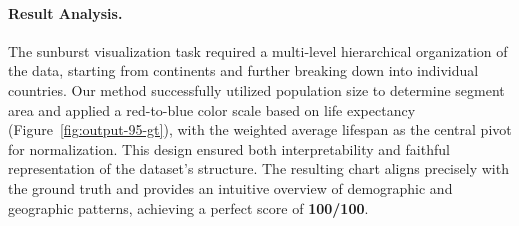 \paragraph{Result Analysis.}
The sunburst visualization task required a multi-level hierarchical organization of the data, 
starting from continents and further breaking down into individual countries. Our method 
successfully utilized population size to determine segment area and applied a red-to-blue 
color scale based on life expectancy (Figure~\ref{fig:output-95-gt}), with the weighted average lifespan as the central pivot 
for normalization. This design ensured both interpretability and faithful representation of 
the dataset’s structure. The resulting chart aligns precisely with the ground truth and 
provides an intuitive overview of demographic and geographic patterns, achieving a perfect 
score of \textbf{100/100}.
